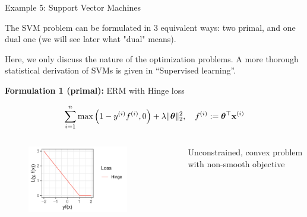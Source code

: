 \documentclass[11pt,compress,t,notes=noshow, xcolor=table]{beamer}
\begin{document}
\begin{vbframe}{Example 5: Support Vector Machines} 

The SVM problem can be formulated in $3$ equivalent ways: two primal, and one dual one (we will see later what "dual" means). 

\begin{footnotesize}
	Here, we only discuss the nature of the optimization problems. A more thorough statistical derivation of SVMs is given in ``Supervised learning''. 
\end{footnotesize}

\vspace*{0.3cm}

\textbf{Formulation 1 (primal): } ERM with Hinge loss

$$
	\sum\limits_{i=1}^n \max\left(1 - y^{(i)} f^{(i)}, 0\right) + \lambda \|\bm{\theta}\|_2^2, \quad f^{(i)} := \bm{\theta}^\top \mathbf{x}^{(i)}
$$

\vspace*{-0.3cm}

\begin{columns}[T] %
	\begin{column}{.58\textwidth}
		\begin{figure}
			\begin{center}
				\includegraphics[width=0.8\textwidth]{figure_man/hinge.pdf}
			\end{center}
		\end{figure}
	\end{column}
	\begin{column}{.38\textwidth} \vspace*{1.5cm}
		\begin{footnotesize}
		Unconstrained, convex problem with non-smooth objective
		\end{footnotesize}
	\end{column}
\end{columns}


\end{vbframe}
\end{document}
